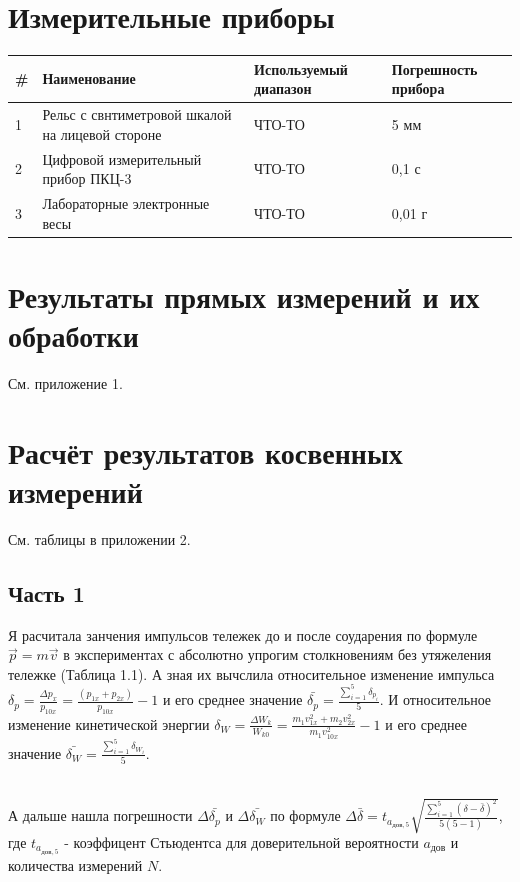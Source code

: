\documentclass[20pt]{article}
\begin{document}
\section{Измерительные приборы}
\begin{tabular}{p{0.5cm} | p{5cm} | p{3cm} | p{2cm} }\hline
# & Наименование & Используемый диапазон & Погрешность прибора \\ \hline
1 & Рельс с свнтиметровой шкалой на лицевой стороне  & ЧТО-ТО  & 5 мм \\  \hline
2 &	Цифровой измерительный прибор ПКЦ-3 & ЧТО-ТО & 	0,1 с \\   \hline
3 & Лабораторные электронные весы & ЧТО-ТО & 0,01 г \\ \hline
\end{tabular}

\section{Результаты прямых измерений и их \mbox{обработки}}
См. приложение 1.
\section{Расчёт результатов косвенных измерений}
См. таблицы в приложении 2.
\subsection*{Часть 1}
Я расчитала занчения импульсов тележек до и после соударения по формуле $\overrightarrow{p} = m\overrightarrow{v}$ в экспериментах с абсолютно упрогим столкновениям без утяжеления тележке (Таблица 1.1). А зная их вычслила относительное изменение импульса $\delta_p = \frac{\Delta p_x}{p_{10x}} = \frac{(p_{1x} + p_{2x})}{p_{10x}} - 1$ и его среднее значение $\bar{\delta_p} = \frac{\sum\limits_{i=1}^5 \delta_{p_i}}{5}$. И относительное изменение кинетической энергии $\delta_W = \frac{\Delta W_k}{W_{k0}} = \frac{m_1 v_{1x}^2 + m_2 v_{2x}^2}{m_1 v_{10x}^2} - 1$ и его среднее значение $\bar{\delta_W} = \frac{\sum\limits_{i=1}^5 \delta_{W_i}}{5}$.

\\ А дальше нашла погрешности $\Delta \bar{\delta_p}$ и $\Delta \bar{\delta_W}$ по формуле $\Delta \bar{\delta} = t_{a_{дов, 5}}\sqrt{\frac{\sum\limits_{i=1}^5 (\delta - \bar{\delta})^2}{5 (5-1)}}$, где $t_{a_{дов, 5}}$ - коэффицент Стьюдентса для доверительной вероятности $a_{дов}$ и количества измерений $N$.
\end{document}
